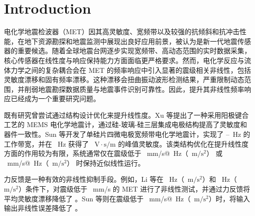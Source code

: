 \documentclass[sn-nature]{sn-jnl}
\begin{document}

\maketitle

\section{Introduction}

电化学地震检波器（MET）因其高灵敏度、宽频带以及较强的抗倾斜和抗冲击性能，在地下资源勘探和地震监测中展现出良好应用前景，被认为是新一代地震传感器的重要候选\cite{10841463}。随着全球地震台网逐步实现宽频带、高动态范围的实时数据采集\cite{WOS:000853457100001}，核心传感器在线性度与响应保持能力方面面临更严格要求。然而，电化学反应与流体力学之间的复杂耦合会在 MET 的频率响应中引入显著的震级相关非线性，包括灵敏度漂移和固有频率漂移。这种漂移会扭曲振动波形检测结果，严重限制动态范围，并削弱地震勘探数据质量与地震事件识别可靠性。因此，提升其非线性频率响应已经成为一个重要研究问题。


既有研究曾尝试通过结构设计优化来提升线性度。Xu 等\cite{9481294}提出了一种采用阳极键合工艺的 MEMS 电化学地震计，通过硅-玻璃-硅三层集成电极结构提高了灵敏度和器件一致性。Sun 等\cite{sun_high-consistency_2017}开发了单硅片四微电极宽频带电化学地震计，实现了 \valXuBandwidthStart--\valXuBandwidthEnd~Hz 的工作带宽，并在 \valXuPeakSensitivityFreq~Hz 获得了 \valXuPeakSensitivity~$\text{V} \cdot \text{s}/\text{m}$ 的峰值灵敏度。该类结构优化在提升线性度方面的作用较为有限，系统通常仅在震级低于 \valXuLinearLimitMm~mm/s@\valLinearLimitRefFreq~Hz（\valXuLinearLimitAcc~$\text{m}/\text{s}^2$）\cite{9481294} 或 \valSunLinearLimitMm~mm/s@\valLinearLimitRefFreq~Hz（\valSunLinearLimitAcc~$\text{m}/\text{s}^2$）\cite{sun_high-consistency_2017} 时保持近似线性运行。

力反馈是一种有效的非线性抑制手段。例如，Li 等\cite{li_electrochemical_2017}在 \valLiForceFreqA~Hz（\valLiForceAccA~$\text{m}/\text{s}^2$）和 \valLiForceFreqB~Hz（\valLiForceAccB~$\text{m}/\text{s}^2$）条件下，对震级低于 \valLiForceMm~mm/s 的 MET 进行了非线性测试，并通过力反馈将平均灵敏度漂移降低了 \valLiSensitivityDriftReduction。Sun 等\cite{WOS:000408118700046}则在震级低于 \valSunForceMm~mm/s@\valSunForceFreq~Hz（\valSunForceAcc~$\text{m}/\text{s}^2$）时，将输入输出非线性误差降低了 \valSunNonlinearErrorReduction。
\end{document}
